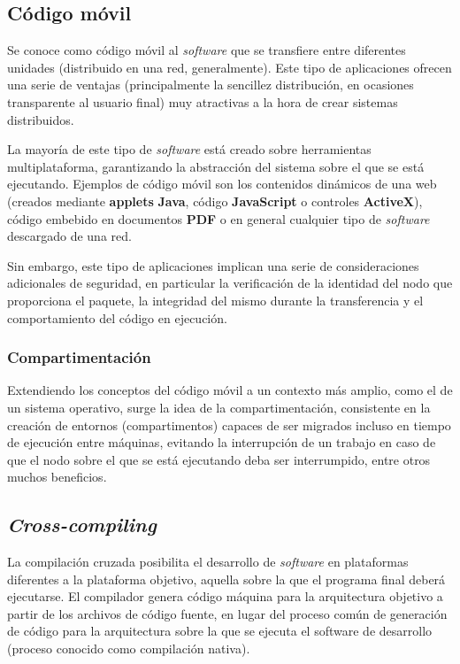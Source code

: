 \subsection{Código móvil}
\label{teoria:codigomovil}

Se conoce como código móvil al \textit{software} que se transfiere entre diferentes unidades (distribuido en una red, generalmente). Este tipo de aplicaciones ofrecen una serie de ventajas (principalmente la sencillez distribución, en ocasiones transparente al usuario final) muy atractivas a la hora de crear sistemas distribuidos.

La mayoría de este tipo de \textit{software} está creado sobre herramientas multiplataforma, garantizando la abstracción del sistema sobre el que se está ejecutando. Ejemplos de código móvil son los contenidos dinámicos de una web (creados mediante \textbf{applets} \textbf{Java}, código \textbf{JavaScript} o controles \textbf{ActiveX}), código embebido en documentos \textbf{PDF} o en general cualquier tipo de \textit{software} descargado de una red.

Sin embargo, este tipo de aplicaciones implican una serie de consideraciones adicionales de seguridad, en particular la verificación de la identidad del nodo que proporciona el paquete, la integridad del mismo durante la transferencia y el comportamiento del código en ejecución.

\subsubsection{Compartimentación}

Extendiendo los conceptos del código móvil a un contexto más amplio, como el de un sistema operativo, surge la idea de la compartimentación, consistente en la creación de entornos (compartimentos) capaces de ser migrados incluso en tiempo de ejecución entre máquinas, evitando la interrupción de un trabajo en caso de que el nodo sobre el que se está ejecutando deba ser interrumpido, entre otros muchos beneficios.

\subsection{\textit{Cross-compiling}}
\label{teoria:crosscompiler}

La compilación cruzada posibilita el desarrollo de \textit{software} en plataformas diferentes a la plataforma objetivo, aquella sobre la que el programa final deberá ejecutarse. El compilador genera código máquina para la arquitectura objetivo a partir de los archivos de código fuente, en lugar del proceso común de generación de código para la arquitectura sobre la que se ejecuta el software de desarrollo (proceso conocido como compilación nativa).

